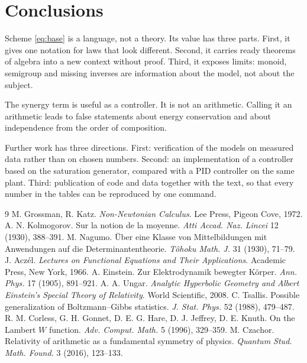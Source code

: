 \documentclass[11pt,a4paper]{article}
\begin{document}
\section{Conclusions}

Scheme \eqref{eq:base} is a language, not a theory. Its value has three parts.
First, it gives one notation for laws that look different. Second, it carries
ready theorems of algebra into a new context without proof. Third, it exposes
limits: monoid, semigroup and missing inverses are information about the model,
not about the subject.

The synergy term is useful as a controller. It is not an arithmetic. Calling it
an arithmetic leads to false statements about energy conservation and about
independence from the order of composition.

Further work has three directions. First: verification of the models on measured
data rather than on chosen numbers. Second: an implementation of a controller
based on the saturation generator, compared with a PID controller on the same
plant. Third: publication of code and data together with the text, so that every
number in the tables can be reproduced by one command.

{\footnotesize
\setlength{\itemsep}{1pt}
\begin{thebibliography}{9}
 M. Grossman, R. Katz.
\emph{Non-Newtonian Calculus}. Lee Press, Pigeon Cove, 1972.
 A. N. Kolmogorov.
Sur la notion de la moyenne. \emph{Atti Accad. Naz. Lincei} 12 (1930), 388--391.
 M. Nagumo.
Über eine Klasse von Mittelbildungen mit Anwendungen auf die
Determinantentheorie. \emph{Tôhoku Math. J.} 31 (1930), 71--79.
 J. Aczél.
\emph{Lectures on Functional Equations and Their Applications}.
Academic Press, New York, 1966.
 A. Einstein.
Zur Elektrodynamik bewegter Körper. \emph{Ann. Phys.} 17 (1905), 891--921.
 A. A. Ungar.
\emph{Analytic Hyperbolic Geometry and Albert Einstein's Special Theory of
Relativity}. World Scientific, 2008.
 C. Tsallis.
Possible generalization of Boltzmann--Gibbs statistics.
\emph{J. Stat. Phys.} 52 (1988), 479--487.
 R. M. Corless, G. H. Gonnet, D. E. G. Hare, D. J. Jeffrey,
D. E. Knuth. On the Lambert $W$ function.
\emph{Adv. Comput. Math.} 5 (1996), 329--359.
 M. Czachor.
Relativity of arithmetic as a fundamental symmetry of physics.
\emph{Quantum Stud. Math. Found.} 3 (2016), 123--133.
\end{thebibliography}
}
\end{document}
